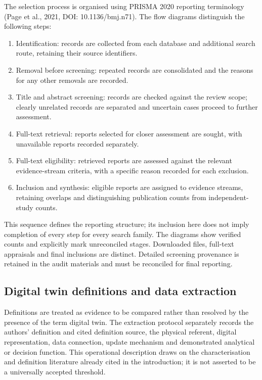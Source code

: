The selection process is organised using PRISMA 2020 reporting terminology (Page et al., 2021, DOI: 10.1136/bmj.n71). The flow diagrams distinguish the following steps:
\begin{enumerate}
\item Identification: records are collected from each database and additional search route, retaining their source identifiers.
\item Removal before screening: repeated records are consolidated and the reasons for any other removals are recorded.
\item Title and abstract screening: records are checked against the review scope; clearly unrelated records are separated and uncertain cases proceed to further assessment.
\item Full-text retrieval: reports selected for closer assessment are sought, with unavailable reports recorded separately.
\item Full-text eligibility: retrieved reports are assessed against the relevant evidence-stream criteria, with a specific reason recorded for each exclusion.
\item Inclusion and synthesis: eligible reports are assigned to evidence streams, retaining overlaps and distinguishing publication counts from independent-study counts.
\end{enumerate}
This sequence defines the reporting structure; its inclusion here does not imply completion of every step for every search family. The diagrams show verified counts and explicitly mark unreconciled stages. Downloaded files, full-text appraisals and final inclusions are distinct. Detailed screening provenance is retained in the audit materials and must be reconciled for final reporting.

\subsection{Digital twin definitions and data extraction}
Definitions are treated as evidence to be compared rather than resolved by the presence of the term digital twin. The extraction protocol separately records the authors' definition and cited definition source, the physical referent, digital representation, data connection, update mechanism and demonstrated analytical or decision function. This operational description draws on the characterisation and definition literature already cited in the introduction; it is not asserted to be a universally accepted threshold.

